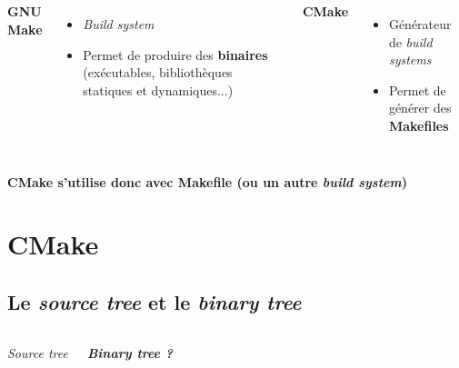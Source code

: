 \documentclass{beamer}
\newenvironment{Frame}{\begin{frame}[containsverbatim]{\subsecname}}{\end{frame}}
\newcommand{\SectionFrame}[0]{
    \begin{frame}
        \centering
        \Large
        \textbf{\secname}
    \end{frame}
}
\begin{document}
\begin{Frame}
    \begin{columns}
        \centering
        \textbf{GNU Make}
        \begin{itemize}
            \item \textit{Build system}
            \item Permet de produire des \textbf{binaires} (exécutables, bibliothèques statiques et dynamiques...)
        \end{itemize}

        \centering
        \textbf{CMake}
        \begin{itemize}
            \item Générateur de \textit{build systems}
            \item Permet de générer des \textbf{Makefiles}
        \end{itemize}
    \end{columns}

    \vspace{2em}

    \begin{center}   
        \textbf{CMake s'utilise donc avec Makefile (ou un autre \textit{build system})}
    \end{center}
\end{Frame}

\section{CMake}

\SectionFrame

\subsection{Le \textit{source tree} et le \textit{binary tree}}

\begin{Frame}
    \setlength{\DTbaselineskip}{1em}
    \begin{columns}
        \begin{center}   
            \textit{Source tree}
        \end{center}
        
        \begin{center}   
            \textit{\textbf{Binary tree ?}}
        \end{center}
    \end{columns}
\end{Frame}
\end{document}
